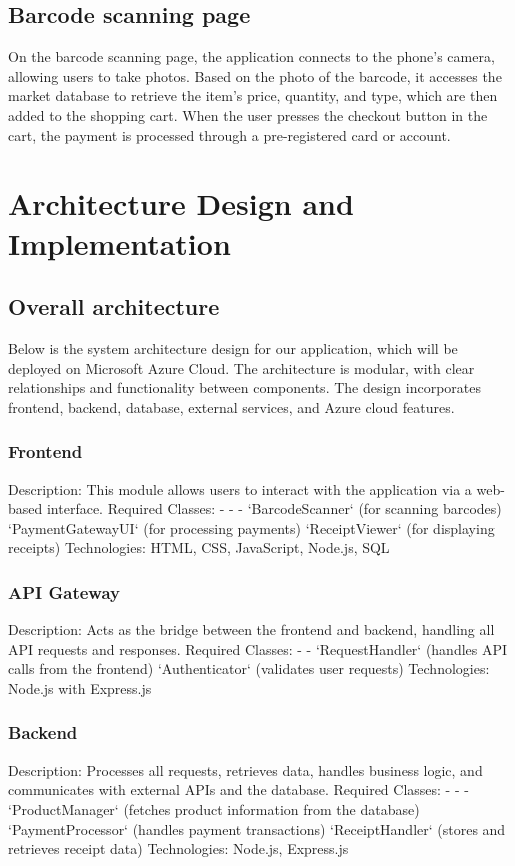 \documentclass[conference]{IEEEtran}
\begin{document}
\subsection{Barcode scanning page }
On the barcode scanning page, the application connects to the phone’s camera, allowing users to take photos. Based on the photo of the barcode, it accesses the market database to retrieve the item's price, quantity, and type, which are then added to the shopping cart. When the user presses the checkout button in the cart, the payment is processed through a pre-registered card or account. 

\section{Architecture Design and Implementation}

\subsection{Overall architecture}
Below is the system architecture design for our application, which will be deployed on 
Microsoft Azure Cloud. The architecture is modular, with clear relationships and 
functionality between components. The design incorporates frontend, backend, 
database, external services, and Azure cloud features. 

\subsubsection{Frontend}
Description: This module allows users to interact with the application via a web-based 
interface. 
Required Classes: - - - 
`BarcodeScanner` (for scanning barcodes) 
`PaymentGatewayUI` (for processing payments) 
`ReceiptViewer` (for displaying receipts) 
Technologies: HTML, CSS, JavaScript, Node.js, SQL 
\subsubsection{API Gateway }
Description: Acts as the bridge between the frontend and backend, handling all API 
requests and responses. 
Required Classes: - - 
`RequestHandler` (handles API calls from the frontend) 
`Authenticator` (validates user requests) 
Technologies: Node.js with Express.js 
\subsubsection{Backend}
Description: Processes all requests, retrieves data, handles business logic, and 
communicates with external APIs and the database. 
Required Classes: - - - 
`ProductManager` (fetches product information from the database) 
`PaymentProcessor` (handles payment transactions) 
`ReceiptHandler` (stores and retrieves receipt data) 
Technologies: Node.js, Express.js 
\end{document}
